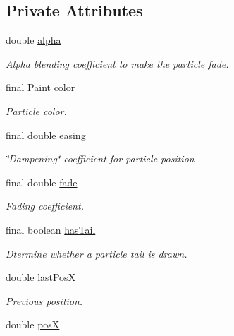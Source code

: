 \subsection*{Private Attributes}
\begin{DoxyCompactItemize}
\item 
double \hyperlink{classbattleship2D_1_1ui_1_1Particle_ad0c4375f37f512dfc526defc826ea8e1}{alpha}
\begin{DoxyCompactList}\small\item\em Alpha blending coefficient to make the particle fade. \end{DoxyCompactList}\item 
final Paint \hyperlink{classbattleship2D_1_1ui_1_1Particle_a0b9479695af9d931940e2bdff6877e80}{color}
\begin{DoxyCompactList}\small\item\em \hyperlink{classbattleship2D_1_1ui_1_1Particle}{Particle} color. \end{DoxyCompactList}\item 
final double \hyperlink{classbattleship2D_1_1ui_1_1Particle_a702cb6c94a6bab26ab8f2d89e9ed006d}{easing}
\begin{DoxyCompactList}\small\item\em \char`\"{}\-Dampening\char`\"{} coefficient for particle position \end{DoxyCompactList}\item 
final double \hyperlink{classbattleship2D_1_1ui_1_1Particle_aacae09c8362b3db517af7cb42e755c90}{fade}
\begin{DoxyCompactList}\small\item\em Fading coefficient. \end{DoxyCompactList}\item 
final boolean \hyperlink{classbattleship2D_1_1ui_1_1Particle_aecbdfda0673ec091a555cbf5c18d346f}{has\-Tail}
\begin{DoxyCompactList}\small\item\em Dtermine whether a particle tail is drawn. \end{DoxyCompactList}\item 
double \hyperlink{classbattleship2D_1_1ui_1_1Particle_af78e18d695e448d974013d67b31cc035}{last\-Pos\-X}
\begin{DoxyCompactList}\small\item\em Previous position. \end{DoxyCompactList}\item 
double \hyperlink{classbattleship2D_1_1ui_1_1Particle_a43ea7800c7ba89fcc30583e2cc0970e4}{pos\-X}

\end{DoxyCompactItemize}
